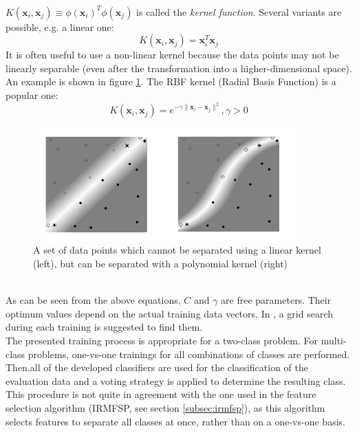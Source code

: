 \medskip
\\
$K(\mathbf{x}_{i},\mathbf{x}_{j}) \equiv \phi(\mathbf{x}_{i})^{T} \phi(\mathbf{x}_{j})$ is called the \textit{kernel function}. Several variants are possible, e.g. a linear one:
\begin{equation}
K(\mathbf{x}_{i},\mathbf{x}_{j}) = \mathbf{x}_{i}^{T}\mathbf{x}_{j}
\end{equation}
It is often useful to use a non-linear kernel because the data points may not be linearly separable (even after the transformation into a higher-dimensional space). An example is shown in figure \ref{fig:svm_kernels}. The RBF kernel (Radial Basis Function) is a popular one:
\begin{equation}
K(\mathbf{x}_{i},\mathbf{x}_{j}) = e^{-\gamma \parallel \mathbf{x}_{i} - \mathbf{x}_{j} \parallel^{2}}, \gamma > 0
\end{equation}
\begin{figure}[htbp]
	\centering
	\includegraphics[width=0.9\textwidth]{images/svm_kernels.png}
	\caption{A set of data points which cannot be separated using a linear kernel (left), but can be separated with a polynomial kernel (right) \cite{article:svm_tutorial}}
	\label{fig:svm_kernels}
\end{figure}
\medskip
\\
As can be seen from the above equations, $C$ and $\gamma$ are free parameters. Their optimum values depend on the actual training data vectors. In \cite{techreport:practical_svm}, a grid search during each training is suggested to find them. 
\medskip
\\
The presented training process is appropriate for a two-class problem. For multi-class problems, one-vs-one trainings for all combinations of classes are performed. Then,all of the developed classifiers are used for the classification of the evaluation data and a voting strategy is applied to determine the resulting class. This procedure is not quite in agreement with the one used in the feature selection algorithm (IRMFSP, see section \ref{subsec:irmfsp}), as this algorithm selects features to separate all classes at once, rather than on a one-vs-one basis.


